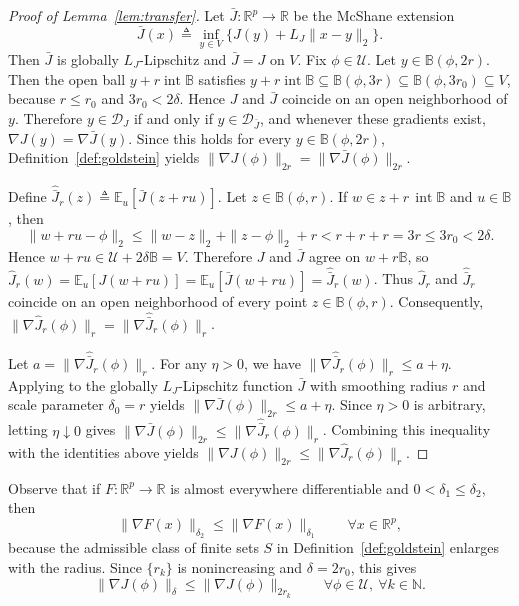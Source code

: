 \documentclass[11pt, letterpaper, oneside, reqno]{amsart}
\newcommand{\R}{\mathbb{R}}
\newcommand{\Let}{\triangleq}
\begin{document}
\begin{proof}[Proof of Lemma~\ref{lem:transfer}]
Let $\bar J:\R^p\to\R$ be the McShane extension
\[
\bar J(x)
\Let \inf_{y\in V}\bigl\{J(y)+L_J\|x-y\|_2\bigr\}.
\]
Then $\bar J$ is globally $L_J$-Lipschitz and $\bar J=J$ on $V$.
Fix $\phi\in\mathcal U$. Let $y\in\mathbb B(\phi,2r)$.
Then the open ball $y+r \operatorname{int}\mathbb B$ satisfies
$y+r \operatorname{int}\mathbb B \subseteq \mathbb B(\phi,3r) \subseteq \mathbb B(\phi,3r_0) \subseteq V$,
because $r\le r_0$ and $3r_0<2\delta$.
Hence $J$ and $\bar J$ coincide on an open neighborhood of $y$.
Therefore $y\in\mathcal D_J$ if and only if $y\in\mathcal D_{\bar J}$, and whenever these gradients exist, $\nabla J(y)=\nabla \bar J(y)$.
Since this holds for every $y\in\mathbb B(\phi,2r)$, Definition~\ref{def:goldstein} yields
$\|\nabla J(\phi)\|_{2r}=\|\nabla \bar J(\phi)\|_{2r}$.

Define
$\widehat{\bar J}_r(z)\Let \mathbb E_u[\bar J(z+r u)]$.
Let $z\in\mathbb B(\phi,r)$.
If $w\in z+r\,\operatorname{int}\mathbb B$ and $u\in\mathbb B$, then
\[
\|w+r u-\phi\|_2
\le \|w-z\|_2+\|z-\phi\|_2+r
< r+r+r
= 3r
\le 3r_0
< 2\delta.
\]
Hence
$w+r u \in \mathcal U+2\delta\mathbb B = V$.
Therefore $J$ and $\bar J$ agree on $w+r\mathbb B$, so
$\hat J_r(w)=\mathbb E_u[J(w+r u)]
= \mathbb E_u[\bar J(w+r u)]
= \widehat{\bar J}_r(w)$.
Thus $\hat J_r$ and $\widehat{\bar J}_r$ coincide on an open neighborhood of every point
$z\in\mathbb B(\phi,r)$. Consequently,
$\|\nabla \hat J_r(\phi)\|_{r}=\|\nabla \widehat{\bar J}_r(\phi)\|_{r}$.

Let $a = \|\nabla \widehat{\bar J}_r(\phi)\|_{r}$.
For any $\eta>0$, we have $\|\nabla \widehat{\bar J}_r(\phi)\|_{r}\le a+\eta$.
Applying \cite[Corollary~6]{ref:cutkosky2023optimal} to the globally $L_J$-Lipschitz function
$\bar J$ with smoothing radius $r$ and scale parameter $\delta_0=r$ yields
$\|\nabla \bar J(\phi)\|_{2r}\le a+\eta$.
Since $\eta>0$ is arbitrary, letting $\eta\downarrow 0$ gives
$\|\nabla \bar J(\phi)\|_{2r}\le \|\nabla \widehat{\bar J}_r(\phi)\|_{r}$.
Combining this inequality with the identities above yields $\|\nabla J(\phi)\|_{2r}\le \|\nabla\hat J_r(\phi)\|_r$.
\end{proof}

Observe that if $F:\R^p\to\R$ is almost everywhere differentiable and $0<\delta_1\le \delta_2$, then
\[
\|\nabla F(x)\|_{\delta_2}\le \|\nabla F(x)\|_{\delta_1}
\qquad\forall x\in\R^p,
\]
because the admissible class of finite sets $S$ in Definition~\ref{def:goldstein} enlarges with the radius.
Since $\{r_k\}$ is nonincreasing and $\delta=2r_0$, this gives
\[
\|\nabla J(\phi)\|_{\delta}
\le \|\nabla J(\phi)\|_{2r_k}
\qquad\forall \phi\in\mathcal U,\ \forall k\in\mathbb N.
\]
\end{document}
